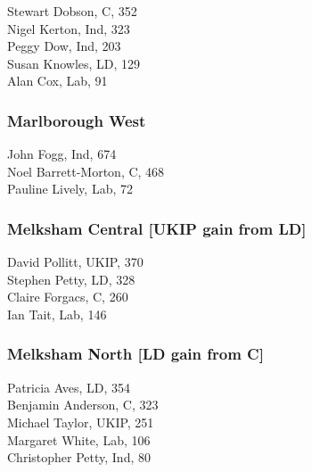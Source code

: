 \documentclass[a4paper,openany,10pt]{book}
\begin{document}


Stewart Dobson, C, 352\\
Nigel Kerton, Ind, 323\\
Peggy Dow, Ind, 203\\
Susan Knowles, LD, 129\\
Alan Cox, Lab, 91\\


\subsubsection*{Marlborough West}



John Fogg, Ind, 674\\
Noel Barrett-Morton, C, 468\\
Pauline Lively, Lab, 72\\


\subsubsection*{Melksham Central \hspace*{\fill}\nolinebreak[1]%
\enspace\hspace*{\fill}
[UKIP gain from LD]}



David Pollitt, UKIP, 370\\
Stephen Petty, LD, 328\\
Claire Forgacs, C, 260\\
Ian Tait, Lab, 146\\


\subsubsection*{Melksham North \hspace*{\fill}\nolinebreak[1]%
\enspace\hspace*{\fill}
[LD gain from C]}



Patricia Aves, LD, 354\\
Benjamin Anderson, C, 323\\
Michael Taylor, UKIP, 251\\
Margaret White, Lab, 106\\
Christopher Petty, Ind, 80\\
\end{document}
